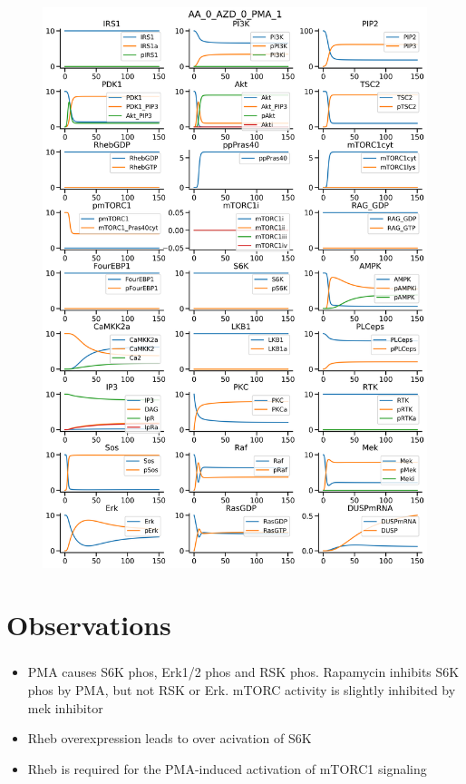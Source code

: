 \documentclass{beamer}
\begin{document}
\begin{frame}
\begin{figure}
\begin{minipage}{0.45\textwidth}
        \includegraphics[width=\textwidth]{../simulations/ExtendedPI3KModel/validations/AAWithAZDWithPMA/AA_0_AZD_0_PMA_1-1.png}
    \end{minipage}
\end{figure}
\end{frame}

\section{Observations}
\begin{frame}
    \frametitle{ \cite{Miyazaki2017}}
    \begin{itemize}
        \item PMA causes S6K phos, Erk1/2 phos and RSK phos. Rapamycin inhibits S6K phos by PMA, but not RSK or Erk. mTORC activity is slightly inhibited by mek inhibitor
        \item Rheb overexpression leads to over acivation of S6K
        \item Rheb is required for the PMA-induced activation of mTORC1 signaling
    \end{itemize}
    \end{frame}
\end{document}
